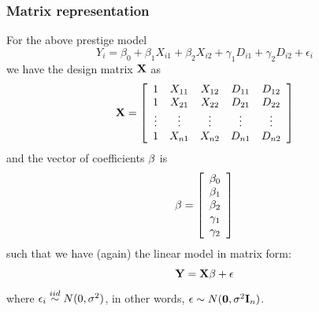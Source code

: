 \subsubsection*{Matrix representation}
For the above prestige model
$$
Y_i = \beta_0 + \beta_1 X_{i1} + \beta_2 X_{i2} + \gamma_1 D_{i1} + \gamma_2 D_{i2} + \epsilon_i
$$
we have the design matrix $\mathbf{X}$ as
$$
\mathbf{X} = \left[ \begin{array}{c c c c c} 
1 & X_{11} & X_{12} & D_{11} & D_{12} \\
1 & X_{21} & X_{22} & D_{21} & D_{22} \\
\vdots &\vdots & \vdots & \vdots & \vdots\\
1 & X_{n1} & X_{n2} & D_{n1} & D_{n2} \\
 \end{array}  \right]
$$
and the vector of coefficients $\mathbf{\beta}$ is
$$
\mathbf{\beta} = \left[ \begin{array}{c} \beta_0\\ \beta_1 \\ \beta_2 \\ \gamma_1 \\ \gamma_2 \\ \end{array} \right]
$$
such that we have (again) the linear model in matrix form:
$$
\mathbf{Y} = \mathbf{X\beta} + \mathbf{\epsilon}
$$
where $\epsilon_i \overset{iid}{\sim} N(0, \sigma^2)$, in other words,  $\mathbf{\epsilon} \sim N(\mathbf{0}, \sigma^2 \mathbf{I}_n)$.

